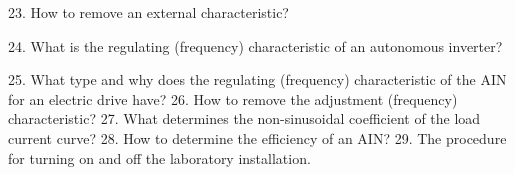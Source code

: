 \documentclass[a4paper,14pt]{article}
\begin{document}
23. How to remove an external characteristic?

24. What is the regulating (frequency) characteristic of an autonomous inverter?

25. What type and why does the regulating (frequency) characteristic of the AIN for an electric drive have?
26. How to remove the adjustment (frequency) characteristic?
27. What determines the non-sinusoidal coefficient of the load current curve?
28. How to determine the efficiency of an AIN?
29. The procedure for turning on and off the laboratory installation.
\end{document}
